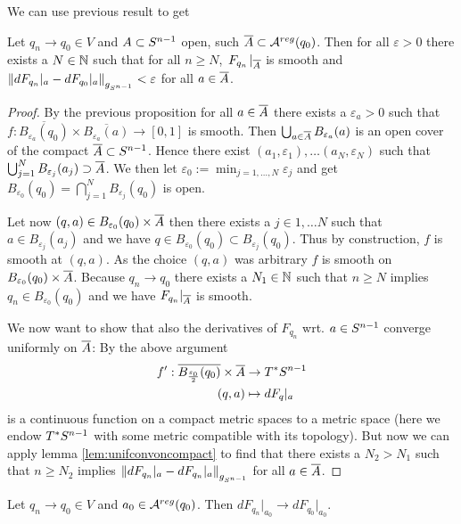 We can use previous result to get
\begin{proposition}\label{prop:dfunifconv}
    Let $q_n\to q_0\in V$ and $A\subset {S^{n-1}}$ open, such ${\overline{A}}\subset {{\mathcal{A}}^{reg}}(q_0)$. Then for all $\varepsilon>0$ there exists a $N\in \mathbb{N}$ such that for all $n \ge N$,  $\left.F_{q_n}\right.\rvert_{\overline{A}}$ is smooth and $\left\lVert dF_{q_n}\rvert_{a} - dF_{q_0}\rvert_{a}\right\rVert_{g_{{S^{n-1}}}}<\varepsilon$ for all $a\in {\overline{A}}$.
\end{proposition}
\begin{proof}
    By the previous proposition for all $a\in {\overline{A}}$ there exists a $\varepsilon_a>0$ such that $f:\overline{B_{\varepsilon_a}(q_0)}\times\overline{B_{\varepsilon_a}(a)}\to [0,1]$ is smooth. Then $\bigcup_{a\in {\overline{A}}} B_{\varepsilon_a}(a)$ is an open cover of the compact ${\overline{A}}\subset {S^{n-1}}$. Hence there exist $(a_1,\varepsilon_1),\dots (a_N,\varepsilon_N)$ such that $\bigcup_{j=1}^N B_{\varepsilon_j}(a_j) \supset {\overline{A}}$. We then let $\varepsilon_0 := \min_{j=1,\dots, N} \varepsilon_j$ and get $B_{\varepsilon_0}(q_0) = \bigcap_{j=1}^N B_{\varepsilon_j}(q_0)$ is open. 

    Let now $(q,a) \in B_{\varepsilon_0}(q_0)\times{\overline{A}}$ then there exists a $j\in {1,\dots N}$ such that $a\in B_{\varepsilon_j}(a_j)$ and we have $q\in B_{\varepsilon_0}(q_0)\subset B_{\varepsilon_j}(q_0)$. Thus by construction, $f$ is smooth at $(q,a)$. As the choice $(q,a)$ was arbitrary $f$ is smooth on $B_{\varepsilon_0}(q_0)\times{\overline{A}}$. Because $q_n\to q_0$ there exists a $N_1\in \mathbb{N}$ such that $n\ge N$ implies $q_n\in B_{\varepsilon_0}(q_0)$ and we have $F_{q_n}\rvert_{{\overline{A}}}$ is smooth.

    We now want to show that also the derivatives of $F_{q_n}$ wrt. $a\in {S^{n-1}}$ converge uniformly on ${\overline{A}}$:
    By the above argument 
    \begin{align*}
        f':{\overline{B_{\frac{\varepsilon_0}{2}}(q_0)}}\times {\overline{A}} &\to T^*{S^{n-1}} \\
        (q,a)&\mapsto dF_q\rvert_a
    \end{align*}
    is a continuous function on a compact metric spaces to a metric space (here we endow $T^*{S^{n-1}}$ with some metric compatible with its topology). 
    But now we can apply lemma \ref{lem:unifconvoncompact} to find that there exists a $N_2>N_1$ such that $n\ge N_2$ implies $\left\lVert dF_{q_n}\rvert_{a} - dF_{q_n}\rvert_{a}\right\rVert_{g_{{S^{n-1}}}}$ for all $a\in {\overline{A}}$.
\end{proof}

\begin{corollary}\label{cor:dfpwconv}
    Let $q_n\to q_0\in V$ and $a_0\in {{\mathcal{A}}^{reg}}(q_0)$. Then $dF_{q_n}\rvert_{a_0} \to dF_{q_0}\rvert_{a_0}$.
\end{corollary}



